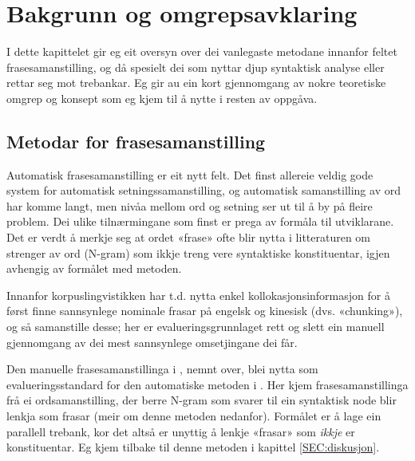 \documentclass[11pt,a4paper,oneside,draft]{book}
\begin{document}
\chapter{Bakgrunn og omgrepsavklaring}
\label{sec-2}

  \label{SEC:bakgrunn}

  
I dette kapittelet gir eg eit oversyn over dei vanlegaste metodane
innanfor feltet frasesamanstilling, og då spesielt dei som nyttar djup
syntaktisk analyse eller rettar seg mot trebankar. Eg gir au ein kort
gjennomgang av nokre teoretiske omgrep og konsept som eg kjem til å
nytte i resten av oppgåva.

\section{Metodar for frasesamanstilling}
\label{sec-2.1}


Automatisk frasesamanstilling er eit nytt felt. Det finst allereie
veldig gode system for automatisk setningssamanstilling, og automatisk
samanstilling av ord har komme langt, men nivåa mellom ord og setning
ser ut til å by på fleire problem.  Dei ulike tilnærmingane
som finst er prega av formåla til utviklarane. Det er verdt å merkje
seg at ordet «frase» ofte blir nytta i litteraturen om strenger av ord
(N-gram) som ikkje treng vere syntaktiske konstituentar, igjen
avhengig av formålet med metoden.

Innanfor korpuslingvistikken har t.d. \citet{piao2001mwu} nytta enkel
kollokasjonsinformasjon for å først finne sannsynlege nominale frasar
på engelsk og kinesisk (dvs. «chunking»), og så samanstille desse; her
er evalueringsgrunnlaget rett og slett ein manuell gjennomgang av dei
mest sannsynlege omsetjingane dei får. 

Den manuelle frasesamanstillinga i \citet{samuelsson2006pap}, nemnt
over, blei nytta som evalueringsstandard for den automatiske metoden i
\citet{samuelsson2007apa}.  Her kjem frasesamanstillinga frå ei
ordsamanstilling, der berre N-gram som svarer til ein syntaktisk node
blir lenkja som frasar (meir om denne metoden nedanfor). Formålet er å
lage ein parallell trebank, kor det altså er unyttig å lenkje «frasar»
som \emph{ikkje} er konstituentar. Eg kjem tilbake til denne metoden i
kapittel \ref{SEC:diskusjon}.
\end{document}

